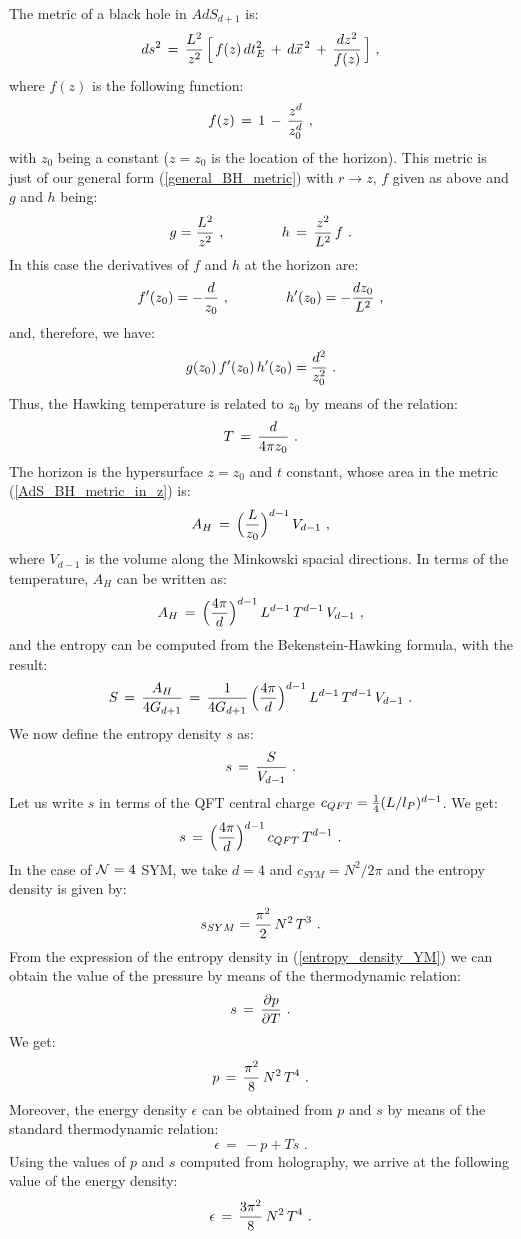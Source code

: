 \documentclass[12pt,notitlepage,a4paper]{article}
\newcommand{\beq}{\begin{equation}}
\newcommand{\eeq}{\end{equation}}
\begin{document}
The metric of a black hole in $AdS_{d+1}$ is:
\beq
ds^2\,=\,{L^2\over z^2}\,\Big[\,f(z)\,dt_E^2\,+\,d\vec x^{\,2}\,+\,{dz^2\over f(z)}\,\Big]\,\,,
\label{AdS_BH_metric_in_z}
\eeq
 where $f(z)$ is the following function:
 \beq
 f(z)\,=\,1\,-\,{z^d\over z_0^d}\,\,,
 \eeq
with $z_0$ being a constant ($z=z_0$ is the location of the horizon). 
This metric is  just of our general form (\ref{general_BH_metric}) with $r\to z$, $f$ given as above and $g$  and $h$ being:
 \beq
 g={L^2\over z^2}
 \,\,, \qquad\qquad
 h\,=\,{z^2\over L^2}\,f\,\,.
 \eeq
In this case the derivatives of $f$ and $h$ at the horizon are:
\beq
f'(z_0)=-{d\over z_0}
 \,\,, \qquad\qquad
 h'(z_0)=-{d z_0\over L^2}\,\,,
 \eeq
and, therefore, we have:
\beq
g(z_0)\,f'(z_0)\,h'(z_0)={d^2\over z_0^2}\,\,.
\eeq
Thus, the Hawking temperature is related to $z_0$ by means of the relation:
\beq
T\,=\,{d\over 4\pi z_0}\,\,.
\eeq
The horizon is the hypersurface $z=z_0$ and $t$ constant, whose area  in the metric (\ref{AdS_BH_metric_in_z}) is:
\beq
A_H\,=\,\Big({L\over z_0}\Big)^{d-1}\,V_{d-1}\,\,,
\eeq
where $V_{d-1}$ is the volume along the Minkowski spacial directions. In terms of the temperature, $A_H$ can be written as:
\beq
A_H\,=\,\Big({4\pi\over d}\Big)^{d-1}\,L^{d-1}\,T^{d-1}\,
V_{d-1}\,\,,
\eeq
and the entropy can be computed from the Bekenstein-Hawking formula, with the result:
\beq
S\,=\,{A_H\over 4G_{d+1}}\,=\,{1\over 4G_{d+1}}\,
\Big({4\pi\over d}\Big)^{d-1}\,L^{d-1}\,T^{d-1}\,
V_{d-1}\,\,. 
\eeq
We now define the entropy density $s$ as:
\beq
s\,=\,{S\over V_{d-1}}\,\,.
\eeq
Let us write $s$ in terms of the QFT central charge $c_{QFT}={1\over 4}
(L/l_P)^{d-1}$. We get:
\beq
s\,=\,\Big({4\pi\over d}\Big)^{d-1}\,c_{QFT}\, T^{d-1}\,\,.
\eeq
In the case of  ${\cal N}=4$ SYM, we take  $d=4$ and $c_{SYM}= N^2/2\pi$ and the entropy density is given by:
\beq
s_{SYM}={\pi^2\over 2}\,N^2\,T^3\,\,.
\label{entropy_density_YM}
\eeq
From the expression of the entropy density  in (\ref{entropy_density_YM}) we can obtain the value of the pressure by means of the thermodynamic relation:
\beq
s\,=\,{\partial p\over \partial T}\,\,.
\label{s_p}
\eeq
We get:
\beq
p\,=\,{\pi^2\over 8}\,N^2\,T^4\,\,.
\eeq
Moreover, the energy density $\epsilon$ can be obtained from $p$ and $s$ by means of the standard thermodynamic relation:
\beq
\epsilon\,=\,-p+Ts\,\,.
\label{epsilon_p_s}
\eeq
Using the values of $p$ and $s$ computed from holography, we arrive at the following value of the energy density:
\beq
\epsilon\,=\,{3\pi^2\over 8}\,N^2\,T^4\,\,.
\eeq
\end{document}
